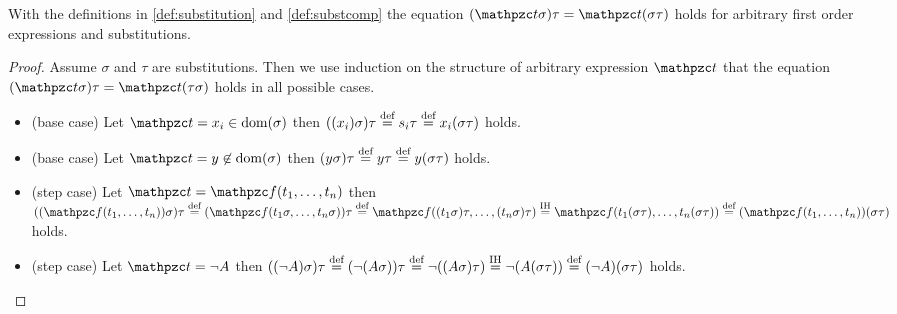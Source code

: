 \begin{lemma}\label{lem:substitution}
	With the definitions in \ref{def:substitution} and \ref{def:substcomp} the equation
	$(\mct\sigma)\tau = \mct(\sigma\tau)$ holds for
	arbitrary first order expressions and substitutions.
\end{lemma}

\begin{proof}
	Assume $\sigma$ and $\tau$ are substitutions. 
	Then we use induction on the structure of arbitrary expression $\mct$
	that the equation $(\mct\sigma)\tau =  \mct(\tau\sigma)$ holds in all possible cases.
	\begin{itemize}
		\item (base case) Let $\mct = x_i \in\dom(\sigma)$ then
		$((x_i)\sigma)\tau\defEQ s_i\tau\defEQ x_i(\sigma\tau)$ holds.
		
		\item (base case) Let $\mct = y \not\in\dom(\sigma)$ then
		$(y\sigma)\tau \defEQ y\tau \defEQ y(\sigma\tau)$ holds. 
		
		\item (step case) Let $\mct = \mcf(t_1,\ldots,t_n)$ 
		then
		$((\mcf(t_1,\ldots,t_n))\sigma)\tau
		\defEQ 
		(\mcf(t_1\sigma,\ldots,t_n\sigma))\tau
		\defEQ 
		\mcf((t_1\sigma)\tau,\ldots,(t_n\sigma)\tau)
		\defEQ[IH]
		\mcf(t_1(\sigma\tau),\ldots,t_n(\sigma\tau))
		\defEQ
		(\mcf(t_1,\ldots,t_n))(\sigma\tau)
		$ holds.
		
		\item (step case) Let $\mct = \lnot A$ then
		$((\lnot A)\sigma)\tau 
		\defEQ 
		(\lnot(A\sigma))\tau 
		\defEQ 
		\lnot((A\sigma)\tau)
		\defEQ[IH]
		\lnot(A(\sigma\tau))
		\defEQ 
		(\lnot A)(\sigma\tau)
		$ holds.
	\end{itemize}
\end{proof}

